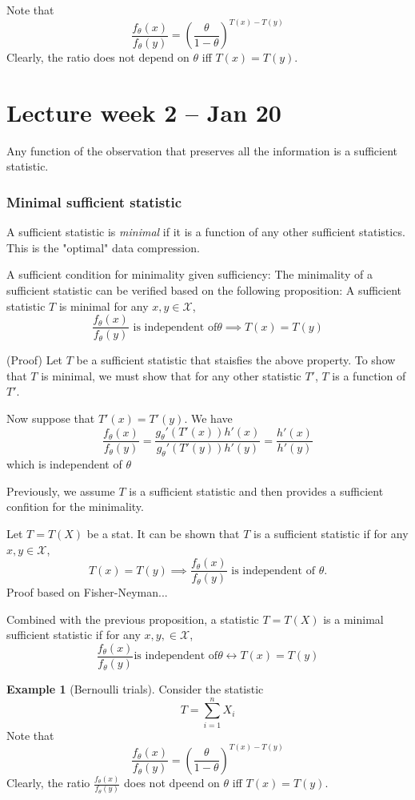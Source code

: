 \documentclass[11pt, oneside]{book}
\theoremstyle{definition}
\newtheorem{exmp}{Example}[section]
\begin{document}
Note that
\[
    \frac{f_\theta(x)}{f_\theta(y)} = \left( \frac{\theta}{1-\theta}\right)^{T(x)-T(y)}
\]
Clearly, the ratio does not depend on $\theta$ iff $T(x)=T(y)$.

\section{Lecture week 2 -- Jan 20}

Any function of the observation that preserves all the information is a sufficient statistic.

\subsubsection{Minimal sufficient statistic}

A sufficient statistic is \textit{minimal} if it is a function of any other sufficient statistics.
This is the "optimal" data compression.

A sufficient condition for minimality given sufficiency:
The minimality of a sufficient statistic can be verified based on the following proposition:
A sufficient statistic $T$ is minimal for any $x, y \in \mathcal{X}$,
\[
    \frac{f_\theta(x)}{f_\theta(y)} \text{ is independent of} \theta \implies T(x) = T(y)
\]

(Proof) Let $T$ be a sufficient statistic that staisfies the above property. To show that $T$
is minimal, we must show that for any other statistic $T'$, $T$ is a function of $T'$.

Now suppose that $T'(x) = T'(y)$. We have
\[
    \frac{f_\theta(x)}{f_\theta(y)} = \frac{g_\theta'(T'(x))h'(x)}{g_\theta'(T'(y))h'(y)} = \frac{h'(x)}{h'(y)}
\]
which is independent of $\theta$

Previously, we assume $T$ is a sufficient statistic and then provides a sufficient confition for the minimality.

Let $T=T(X)$ be a stat. It can be shown that $T$ is a sufficient statistic if for any $x, y \in \mathcal{X}$,
\[
    T(x)=T(y) \implies \frac{f_\theta(x)}{f_\theta(y)} \text{ is independent of } \theta.
\]
Proof based on Fisher-Neyman...

Combined with the previous proposition, a statistic $T=T(X)$ is a minimal sufficient statistic 
if for any $x, y, \in \mathcal{X}$,
\[
    \frac{f_\theta(x)}{f_\theta(y)} \text{is independent of} \theta \leftrightarrow T(x) = T(y)
\]

\begin{exmp}
    [Bernoulli trials]
    Consider the statistic
    \[
        T = \sum_{i=1}^{n} X_i   
    \]
    Note that
    \[
        \frac{f_\theta(x)}{f_\theta(y)} = \left(\frac{\theta}{1-\theta}\right)^{T(x)-T(y)}
    \]
    Clearly, the ratio $\frac{f_\theta(x)}{f_\theta(y)}$ does not dpeend on $\theta$ iff $T(x) = T(y)$.
\end{exmp}
\end{document}
